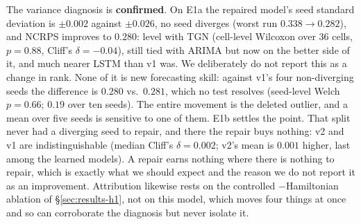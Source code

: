 \documentclass[journal]{IEEEtran}
\begin{document}
The variance diagnosis is \textbf{confirmed}. On E1a the repaired model's seed
standard deviation is $\pm0.002$ against $\pm0.026$, no seed diverges (worst run
$0.338 \to 0.282$),
and NCRPS improves to $0.280$: level with TGN (cell-level Wilcoxon over 36 cells,
$p = 0.88$, Cliff's $\delta = -0.04$), still tied with ARIMA but now on the better
side of it, and much nearer LSTM than v1 was. We deliberately do not report this as a
change in rank. None of it is new forecasting skill: against v1's four non-diverging
seeds the difference is $0.280$ vs.\ $0.281$, which no test resolves (seed-level Welch
$p = 0.66$; $0.19$ over ten seeds). The entire movement is the deleted outlier, and a mean over five seeds is
sensitive to one of them. E1b settles
the point. That split never had a diverging seed to repair, and there the repair buys
nothing: v2 and v1 are indistinguishable (median Cliff's $\delta = 0.002$; v2's mean
is $0.001$ higher, last among the learned models). A repair earns nothing where there
is nothing to repair, which is exactly what we should expect and the reason we do not
report it as an improvement. Attribution likewise rests on the controlled $-$Hamiltonian ablation of
\S\ref{sec:results-h1}, not on this model, which moves four things at once and so can
corroborate the diagnosis but never isolate it.
\end{document}
